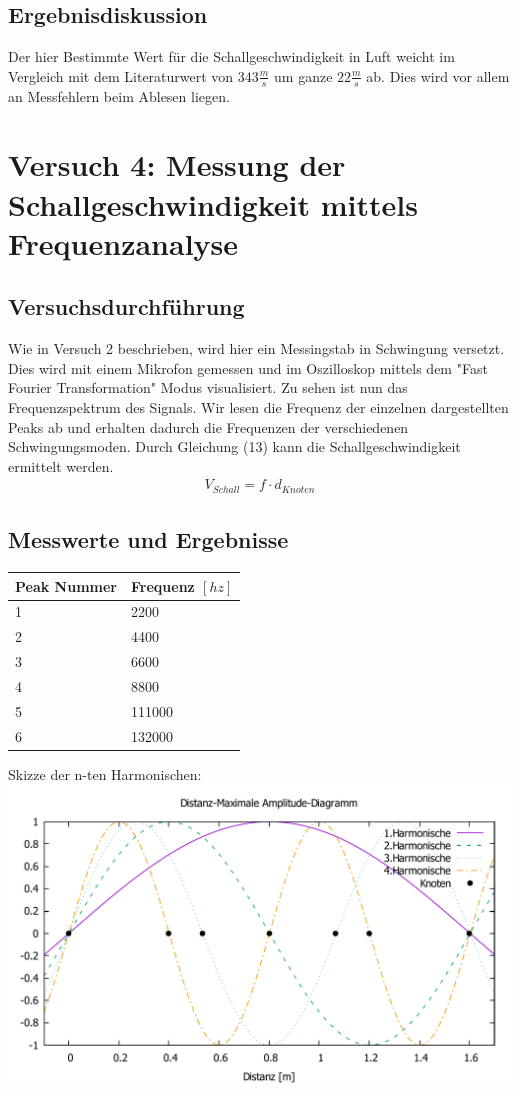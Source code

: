 \documentclass{scrartcl}
\begin{document}
\subsection{Ergebnisdiskussion}
Der hier Bestimmte Wert für die Schallgeschwindigkeit in Luft weicht im  Vergleich mit dem Literaturwert von $343 \frac{m}{s}$ um ganze $22\frac{m}{s}$ ab. Dies wird vor allem an Messfehlern beim Ablesen liegen.
\section{Versuch 4: Messung der Schallgeschwindigkeit mittels Frequenzanalyse}
\subsection{Versuchsdurchführung}
Wie in Versuch 2 beschrieben, wird hier ein Messingstab in Schwingung versetzt. Dies wird mit einem Mikrofon gemessen und im Oszilloskop mittels dem "Fast Fourier Transformation" Modus visualisiert. Zu sehen ist nun das Frequenzspektrum des Signals. Wir lesen die Frequenz der einzelnen dargestellten Peaks ab und erhalten dadurch die Frequenzen der verschiedenen Schwingungsmoden. Durch Gleichung (13) kann die Schallgeschwindigkeit ermittelt werden.\begin{align}
V_{Schall} = f \cdot d_{Knoten}
\end{align}
\subsection{Messwerte und Ergebnisse}
\begin{table}[h]
\begin{tabular}{l|l}
Peak Nummer &	Frequenz $[hz]$\\ \hline
1			&	2200\\
2			&	4400\\
3			&	6600\\
4			&	8800\\
5			&	111000\\
6			&	132000\\
\end{tabular}
\end{table}
Skizze der n-ten Harmonischen:\\
\includegraphics[width=1\textwidth]{Versuch4_skizze.pdf}\\
\end{document}
